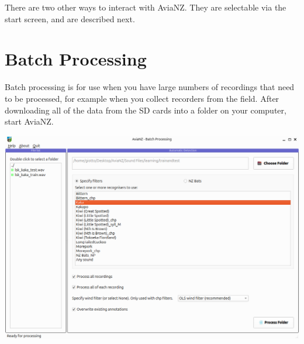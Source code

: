 \documentclass{article}
\begin{document}
There are two other ways to interact with AviaNZ. They are selectable via the start screen, and are described next.

\newpage
\section{Batch Processing}
\label{sec:auto}

Batch processing is for use when you have large numbers of recordings that need to be processed, for example when you collect recorders from the field. After downloading all of the data from the SD cards into a folder on your computer, start AviaNZ. 

\begin{center}
\includegraphics[width=.95\textwidth]{Figures/BatchProcessing}
\end{center}
\end{document}
